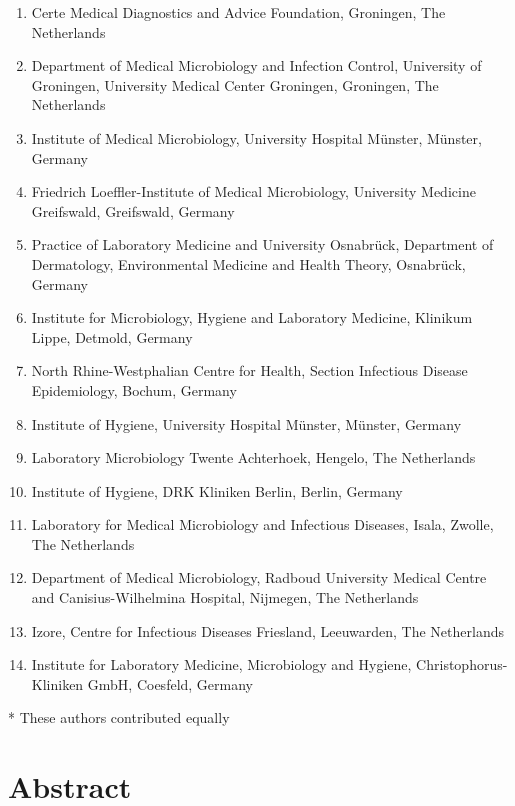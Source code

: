 \documentclass[
]{book}
\providecommand{\tightlist}{%
  \setlength{\itemsep}{0pt}\setlength{\parskip}{0pt}}
\begin{document}
\begin{enumerate}
\def\labelenumi{\arabic{enumi}.}
\tightlist
\item
  Certe Medical Diagnostics and Advice Foundation, Groningen, The Netherlands
\item
  Department of Medical Microbiology and Infection Control, University of Groningen, University Medical Center Groningen, Groningen, The Netherlands
\item
  Institute of Medical Microbiology, University Hospital Münster, Münster, Germany
\item
  Friedrich Loeffler-Institute of Medical Microbiology, University Medicine Greifswald, Greifswald, Germany
\item
  Practice of Laboratory Medicine and University Osnabrück, Department of Dermatology, Environmental Medicine and Health Theory, Osnabrück, Germany
\item
  Institute for Microbiology, Hygiene and Laboratory Medicine, Klinikum Lippe, Detmold, Germany
\item
  North Rhine-Westphalian Centre for Health, Section Infectious Disease Epidemiology, Bochum, Germany
\item
  Institute of Hygiene, University Hospital Münster, Münster, Germany
\item
  Laboratory Microbiology Twente Achterhoek, Hengelo, The Netherlands
\item
  Institute of Hygiene, DRK Kliniken Berlin, Berlin, Germany
\item
  Laboratory for Medical Microbiology and Infectious Diseases, Isala, Zwolle, The Netherlands
\item
  Department of Medical Microbiology, Radboud University Medical Centre and Canisius-Wilhelmina Hospital, Nijmegen, The Netherlands
\item
  Izore, Centre for Infectious Diseases Friesland, Leeuwarden, The Netherlands
\item
  Institute for Laboratory Medicine, Microbiology and Hygiene, Christophorus-Kliniken GmbH, Coesfeld, Germany
\end{enumerate}

* These authors contributed equally

\hypertarget{abstract-8}{%
\section*{Abstract}\label{abstract-8}}
\end{document}
